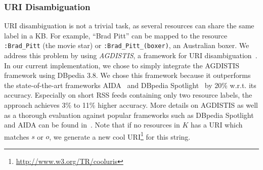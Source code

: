 \subsubsection{URI Disambiguation}\label{urigen}
URI disambiguation is not a trivial task, as several resources can share the same label in a  \ac{KB}. 
For example, ``Brad Pitt'' can be mapped to the resource \texttt{:Brad\_Pitt} (the movie star) or \texttt{:Brad\_Pitt\_(boxer)}, an Australian boxer. 
We address this problem by using \emph{AGDISTIS}, a framework for URI disambiguation~\cite{agdistis_iswc}.
In our current implementation, we chose to simply integrate the AGDISTIS framework using DBpedia 3.8.
We chose this framework because it outperforms the state-of-the-art frameworks AIDA~\cite{AIDA} and DBpedia Spotlight~\cite{spotlight} by 20\% w.r.t. its accuracy. 
Especially on short RSS feeds containing only two resource labels, the approach achieves 3\%  to 11\% higher accuracy. 
More details on AGDISTIS as well as a thorough evaluation against popular frameworks such as DBpedia Spotlight and AIDA can be found in~\cite{agdistis_iswc}.
Note that if no resources in $K$ has a URI which matches $s$ or $o$, we generate a new cool URI\footnote{\url{http://www.w3.org/TR/cooluris}} for this string.%

